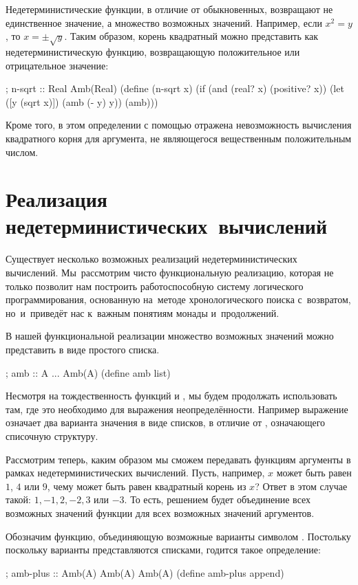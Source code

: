 Недетерминистические функции, в отличие от обыкновенных, возвращают не единственное значение, а множество возможных значений.
Например, если $x^2 = y$, то $x = \pm\sqrt{y}$. Таким образом, корень квадратный можно представить как недетерминистическую функцию, возвращающую положительное или отрицательное значение:

\begin{SchemeCode}
  ; n-sqrt :: Real \arrow Amb(Real)
  (define (n-sqrt x)
    (if (and (real? x) (positive? x))
        (let ([y (sqrt x)]) 
          (amb (- y) y))
        (amb)))
\end{SchemeCode}
Кроме того, в этом определении с помощью  отражена невозможность вычисления  квадратного корня для аргумента, не являющегося вещественным положительным числом.

\section[4]{Реализация недетерминистических~вычислений}%
Существует несколько возможных реализаций недетерминистических вычислений. Мы~рассмотрим чисто функциональную реализацию, которая не только позволит нам построить работоспособную систему логического программирования, основанную на~методе хронологического поиска с~возвратом, но~и~приведёт нас к~важным понятиям монады и~продолжений.

В нашей функциональной реализации множество возможных значений можно представить в виде простого списка.
\begin{Definition}[emph={x,f}]
  ; amb :: A ... \arrow Amb(A)
  (define amb list)
\end{Definition}
Несмотря на тождественность функций  и , мы будем продолжать использовать  там, где это необходимо для выражения неопределённости. Например выражение  означает два варианта значения в виде списков, в отличие от  , означающего списочную структуру.

Рассмотрим теперь, каким образом мы сможем передавать функциям аргументы в рамках недетерминистических вычислений. Пусть, например, $x$ может быть равен $1$, $4$ или $9$, чему может быть равен квадратный корень из $x$? Ответ в этом случае такой: $1, -1, 2, -2, 3$ или $-3$. То есть, решением будет объединение всех возможных значений функции для всех возможных значений аргументов.

Обозначим функцию, объединяющую возможные варианты символом . Постольку поскольку варианты представляются списками, годится такое определение:
\begin{Definition}[emph={x,f}]
  ; amb-plus :: Amb(A) Amb(A) \arrow Amb(A)
  (define amb-plus append)
\end{Definition}

